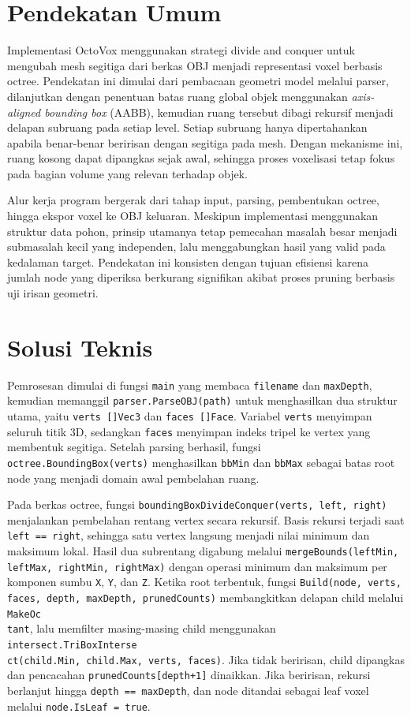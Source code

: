\section{Pendekatan Umum}
Implementasi OctoVox menggunakan strategi divide and conquer untuk mengubah mesh segitiga dari berkas OBJ menjadi representasi voxel berbasis octree. Pendekatan ini dimulai dari pembacaan geometri model melalui parser, dilanjutkan dengan penentuan batas ruang global objek menggunakan \textit{axis-aligned bounding box} (AABB), kemudian ruang tersebut dibagi rekursif menjadi delapan subruang pada setiap level. Setiap subruang hanya dipertahankan apabila benar-benar beririsan dengan segitiga pada mesh. Dengan mekanisme ini, ruang kosong dapat dipangkas sejak awal, sehingga proses voxelisasi tetap fokus pada bagian volume yang relevan terhadap objek.

Alur kerja program bergerak dari tahap input, parsing, pembentukan octree, hingga ekspor voxel ke OBJ keluaran. Meskipun implementasi menggunakan struktur data pohon, prinsip utamanya tetap pemecahan masalah besar menjadi submasalah kecil yang independen, lalu menggabungkan hasil yang valid pada kedalaman target. Pendekatan ini konsisten dengan tujuan efisiensi karena jumlah node yang diperiksa berkurang signifikan akibat proses pruning berbasis uji irisan geometri.

\section{Solusi Teknis}
Pemrosesan dimulai di fungsi \texttt{main} yang membaca \texttt{filename} dan \texttt{maxDepth}, kemudian memanggil \texttt{parser.ParseOBJ(path)} untuk menghasilkan dua struktur utama, yaitu \texttt{verts []Vec3} dan \texttt{faces []Face}. Variabel \texttt{verts} menyimpan seluruh titik 3D, sedangkan \texttt{faces} menyimpan indeks tripel ke vertex yang membentuk segitiga. Setelah parsing berhasil, fungsi \texttt{octree.BoundingBox(verts)} menghasilkan \texttt{bbMin} dan \texttt{bbMax} sebagai batas root node yang menjadi domain awal pembelahan ruang.

Pada berkas octree, fungsi \texttt{boundingBoxDivideConquer(verts, left, right)} menjalankan pembelahan rentang vertex secara rekursif. Basis rekursi terjadi saat \texttt{left == right}, sehingga satu vertex langsung menjadi nilai minimum dan maksimum lokal. Hasil dua subrentang digabung melalui \texttt{mergeBounds(leftMin, leftMax, rightMin, rightMax)} dengan operasi minimum dan maksimum per komponen sumbu \texttt{X}, \texttt{Y}, dan \texttt{Z}. Ketika root terbentuk, fungsi \texttt{Build(node, verts, faces, depth, maxDepth, prunedCounts)} membangkitkan delapan child melalui \texttt{MakeOc\\tant}, lalu memfilter masing-masing child menggunakan \texttt{intersect.TriBoxInterse\\ct(child.Min, child.Max, verts, faces)}. Jika tidak beririsan, child dipangkas dan pencacahan \texttt{prunedCounts[depth+1]} dinaikkan. Jika beririsan, rekursi berlanjut hingga \texttt{depth == maxDepth}, dan node ditandai sebagai leaf voxel melalui \texttt{node.IsLeaf = true}.

